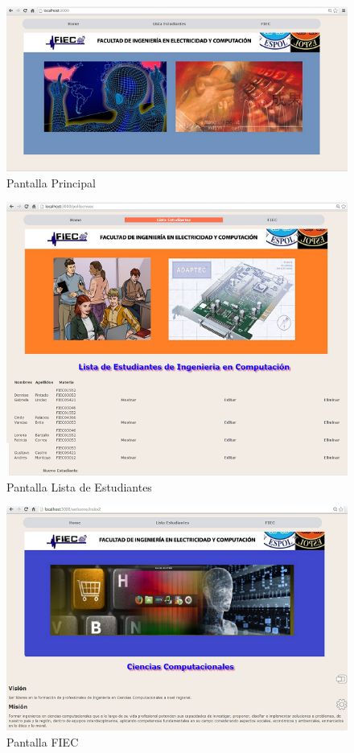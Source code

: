\begin{figure}
\centering
\includegraphics{imagenes/pantallahome.png}
\caption{Pantalla Principal}
\label{fig: threadsVsSync}
\end{figure}

\begin{figure}
\centering
\includegraphics[scale=0.8]{imagenes/pantallalista.png}
\caption{Pantalla Lista de Estudiantes}
\label{fig: threadsVsSync}
\end{figure}


\begin{figure}
\centering
\includegraphics[scale=0.8]{imagenes/pantallafiec.png}
\caption{Pantalla FIEC}
\label{fig: threadsVsSync}
\end{figure}


